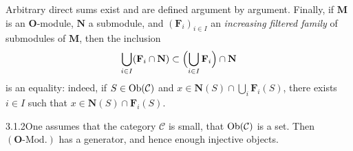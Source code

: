 Arbitrary direct sums exist and are defined \og argument by argument\fg.
Finally, if \(\mathbf{M}\) is an \(\mathbf{O}\)-module, \(\mathbf{N}\) a
submodule, and \((\mathbf{F}_i)_{i\in I}\) an \emph{increasing filtered
family} of submodules of \(\mathbf{M}\), then the inclusion
\[
\bigcup_{i\in I}(\mathbf{F}_i\cap\mathbf{N})
\subset\Bigl(\bigcup_{i\in I}\mathbf{F}_i\Bigr)\cap\mathbf{N}
\]
is an equality: indeed, if \(S\in\operatorname{Ob}(\mathcal{C})\) and
\(x\in\mathbf{N}(S)\cap\bigcup_i\mathbf{F}_i(S)\), there exists \(i\in I\)
such that \(x\in\mathbf{N}(S)\cap\mathbf{F}_i(S)\).

\begin{proposition}{3.1.2}\label{I.3.1.2}\footnotemark[\value{footnote}]
One assumes that the category \(\mathcal{C}\) is small, \ie that
\(\operatorname{Ob}(\mathcal{C})\) is a set. Then \((\mathbf{O}\text{-Mod.})\) has a
generator, and hence enough injective objects.
\end{proposition}

